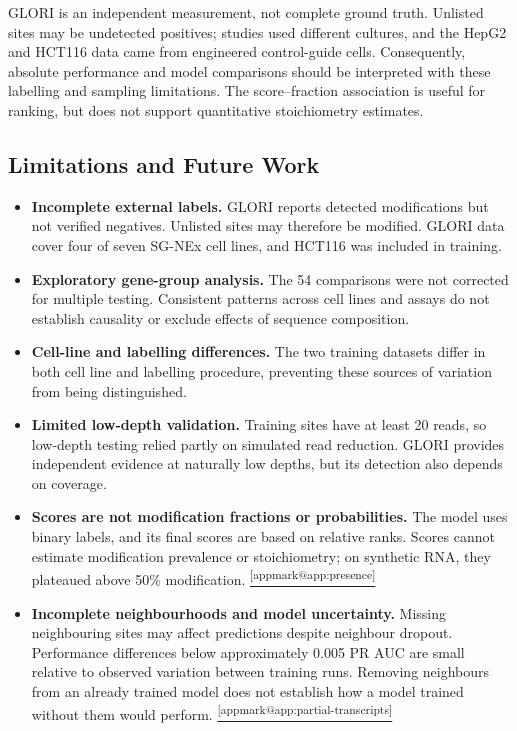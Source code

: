 \documentclass[11pt,a4paper]{article}
\makeatletter
\DeclareRobustCommand{\applink}[1]{%
    \hyperref[#1]{\textsuperscript{\ref*{appmark@#1}}}}
\makeatother
\begin{document}
GLORI is an independent measurement, not complete ground truth. Unlisted
sites may be undetected positives; studies used different cultures, and the
HepG2 and HCT116 data came from engineered control-guide cells. Consequently,
absolute performance and model comparisons should be interpreted with these
labelling and sampling limitations. The score--fraction association is useful
for ranking, but does not support quantitative stoichiometry estimates.

\subsection{Limitations and Future Work}
\label{sec:limits}

\begin{itemize}
    \item \textbf{Incomplete external labels.} GLORI reports detected modifications but not verified negatives. Unlisted sites may therefore be modified. GLORI data cover four of seven SG-NEx cell lines, and HCT116 was included in training.
    \item \textbf{Exploratory gene-group analysis.} The 54 comparisons were not corrected for multiple testing. Consistent patterns across cell lines and assays do not establish causality or exclude effects of sequence composition.

    \item \textbf{Cell-line and labelling differences.} The two training datasets differ in both cell line and labelling procedure, preventing these sources of variation from being distinguished.
    \item \textbf{Limited low-depth validation.} Training sites have at least 20 reads, so low-depth testing relied partly on simulated read reduction. GLORI provides independent evidence at naturally low depths, but its detection also depends on coverage.
    \item \textbf{Scores are not modification fractions or probabilities.}
    The model uses binary labels, and its final scores are based on relative ranks. Scores cannot estimate modification prevalence or stoichiometry; on synthetic RNA, they plateaued above 50\% modification.\applink{app:presence} 
    \item \textbf{Incomplete neighbourhoods and model uncertainty.}
    Missing neighbouring sites may affect predictions despite neighbour dropout. Performance differences below approximately 0.005 PR AUC are small relative to observed variation between training runs. Removing neighbours from an already trained model does not establish how a model trained without them would perform.\applink{app:partial-transcripts}
\end{itemize}
\end{document}
